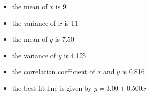 \documentclass{article}
\begin{document}
\begin{itemize}
\item the mean of $x$ is 9
\item the variance of $x$ is 11
\item the mean of $y$ is 7.50
\item the variance of $y$ is 4.125
\item the correlation coefficient of $x$ and $y$ is 0.816
\item the best fit line is given by $y = 3.00 + 0.500 x$
\end{itemize}
\end{document}
